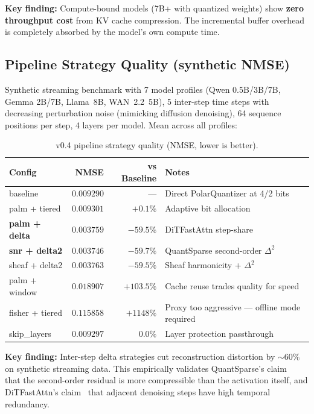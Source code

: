 \documentclass[11pt,a4paper]{article}
\begin{document}
\textbf{Key finding:} Compute-bound models (7B+ with quantized weights) show \textbf{zero throughput cost} from KV cache compression. The incremental buffer overhead is completely absorbed by the model's own compute time.

\subsection{Pipeline Strategy Quality (synthetic NMSE)}

Synthetic streaming benchmark with 7 model profiles (Qwen 0.5B/3B/7B, Gemma 2B/7B, Llama~8B, WAN~2.2~5B), 5 inter-step time steps with decreasing perturbation noise (mimicking diffusion denoising), 64 sequence positions per step, 4 layers per model. Mean across all profiles:

\begin{table}[h]
\centering
\caption{v0.4 pipeline strategy quality (NMSE, lower is better).}
\label{tab:pipeline-nmse}
\begin{tabular}{lrrl}
\toprule
\textbf{Config} & \textbf{NMSE} & \textbf{vs Baseline} & \textbf{Notes} \\
\midrule
baseline                  & $0.009290$ & ---       & Direct PolarQuantizer at 4/2 bits \\
palm + tiered             & $0.009301$ & $+0.1\%$  & Adaptive bit allocation \\
\textbf{palm + delta}     & $\mathbf{0.003759}$ & $\mathbf{-59.5\%}$ & DiTFastAttn step-share \\
\textbf{snr + delta2}     & $\mathbf{0.003746}$ & $\mathbf{-59.7\%}$ & QuantSparse second-order $\Delta^2$ \\
sheaf + delta2            & $0.003763$ & $-59.5\%$ & Sheaf harmonicity + $\Delta^2$ \\
palm + window             & $0.018907$ & $+103.5\%$ & Cache reuse trades quality for speed \\
fisher + tiered           & $0.115858$ & $+1148\%$ & Proxy too aggressive --- offline mode required \\
skip\_layers              & $0.009297$ & $0.0\%$   & Layer protection passthrough \\
\bottomrule
\end{tabular}
\end{table}

\textbf{Key finding:} Inter-step delta strategies cut reconstruction distortion by ${\sim}60\%$ on synthetic streaming data. This empirically validates QuantSparse's claim~\cite{quantsparse2025} that the second-order residual is more compressible than the activation itself, and DiTFastAttn's claim~\cite{yuan2024ditfastattn} that adjacent denoising steps have high temporal redundancy.
\end{document}
